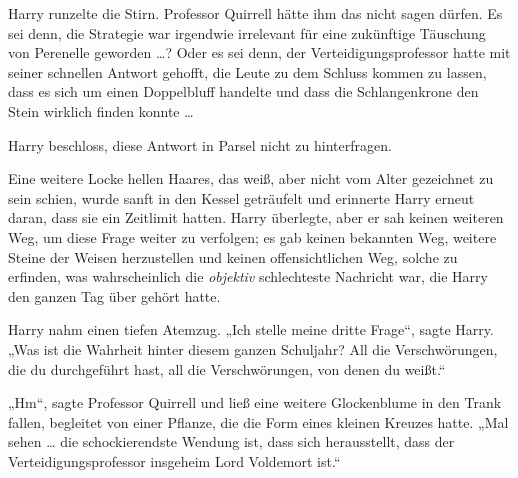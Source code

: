 Harry runzelte die Stirn.
Professor Quirrell hätte ihm das nicht sagen dürfen. Es sei denn, die Strategie war irgendwie irrelevant für eine zukünftige Täuschung von Perenelle geworden …? Oder es sei denn, der Verteidigungsprofessor hatte mit seiner schnellen Antwort gehofft, die Leute zu dem Schluss kommen zu lassen, dass es sich um einen Doppelbluff handelte und dass die Schlangenkrone den Stein wirklich finden konnte …

Harry beschloss, diese Antwort in Parsel nicht zu hinterfragen.

Eine weitere Locke hellen Haares, das weiß, aber nicht vom Alter gezeichnet zu sein schien, wurde sanft in den Kessel geträufelt und erinnerte Harry erneut daran, dass sie ein Zeitlimit hatten.
Harry überlegte, aber er sah keinen weiteren Weg, um diese Frage weiter zu verfolgen; es gab keinen bekannten Weg, weitere Steine der Weisen herzustellen und keinen offensichtlichen Weg, solche zu erfinden, was wahrscheinlich die \emph{objektiv} schlechteste Nachricht war, die Harry den ganzen Tag über gehört hatte.

Harry nahm einen tiefen Atemzug.
„Ich stelle meine dritte Frage“, sagte Harry.
„Was ist die Wahrheit hinter diesem ganzen Schuljahr? All die Verschwörungen, die du durchgeführt hast, all die Verschwörungen, von denen du weißt.“

„Hm“, sagte Professor Quirrell und ließ eine weitere Glockenblume in den Trank fallen, begleitet von einer Pflanze, die die Form eines kleinen Kreuzes hatte.
„Mal sehen … die schockierendste Wendung ist, dass sich herausstellt, dass der Verteidigungsprofessor insgeheim Lord Voldemort ist.“

